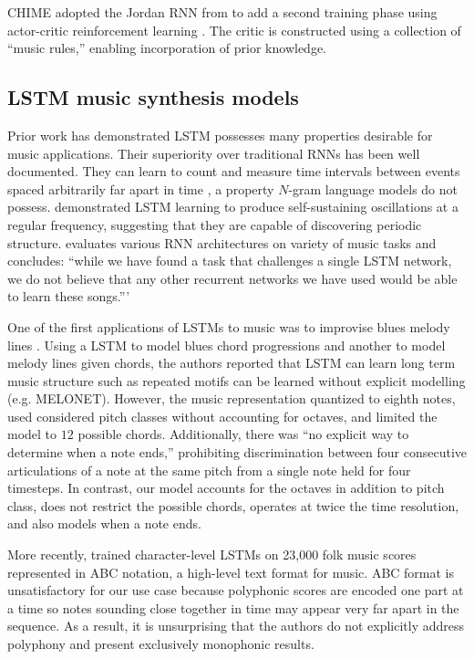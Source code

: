 \documentclass[dissertation.tex]{subfiles}
\begin{document}
CHIME \cite{franklin2001learning} adopted the Jordan RNN from
\cite{todd1989connectionist} to add a second training phase using actor-critic
reinforcement learning \cite{sutton1998reinforcement}. The critic is
constructed using a collection of ``music rules,'' enabling incorporation of
prior knowledge.

\subsection{LSTM music synthesis models}

Prior work has demonstrated LSTM possesses many properties desirable for music
applications. Their superiority over traditional RNNs has been well
documented\cite{gers2001lstm}. They can learn to count and measure time
intervals between events spaced arbitrarily far apart in time
\cite{gers2000recurrent}, a property $N$-gram language models do not possess.
\cite{gers2002learning} demonstrated LSTM learning to produce self-sustaining
oscillations at a regular frequency, suggesting that they are capable of
discovering periodic structure. \cite{franklin2006recurrent} evaluates various
RNN architectures on variety of music tasks and concludes: ``while we have
found a task that challenges a single LSTM network, we do not believe that any
other recurrent networks we have used would be able to learn these songs.'''

One of the first applications of LSTMs to music was to improvise blues melody
lines \cite{Eck2002}\cite{Eck2002-blues}. Using a LSTM to model blues chord
progressions and another to model melody lines given chords, the authors
reported that LSTM can learn long term music structure such as repeated motifs
can be learned without explicit modelling (e.g. MELONET). However, the music
representation quantized to eighth notes, used considered pitch classes without
accounting for octaves, and limited the model to $12$ possible chords.
Additionally, there was ``no explicit way to determine when a note ends,''
prohibiting discrimination between four consecutive articulations of a note at
the same pitch from a single note held for four timesteps. In contrast, our
model accounts for the octaves in addition to pitch class, does not restrict
the possible chords, operates at twice the time resolution, and also
models when a note ends.

More recently, \cite{sturm2015folk} \cite{sturm2016music} trained
character-level LSTMs on 23,000 folk music scores represented in ABC
notation\cite{abcstandard}, a high-level text format for music. ABC format is
unsatisfactory for our use case because polyphonic scores are encoded one part
at a time so notes sounding close together in time may appear very far apart in
the sequence. As a result, it is unsurprising that the authors do not
explicitly address polyphony and present exclusively monophonic results.
\end{document}
